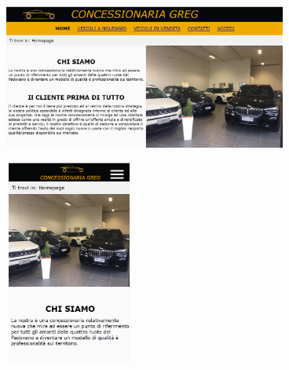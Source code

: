         \begin{center}
            \includegraphics[width=22pc, height=13pc]{./img/HomeDesktop.png} \includegraphics[width=10pc, height=16pc]{./img/HomeMobile.png}
        \end{center}

